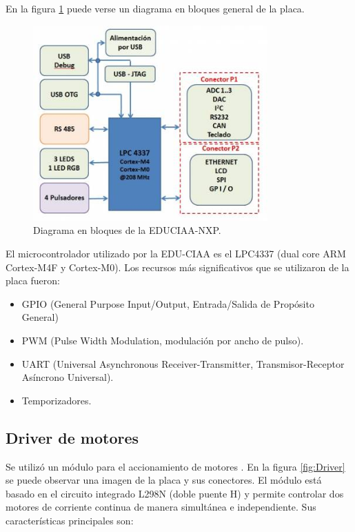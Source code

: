 \pagebreak

En la figura \ref{fig:Bloques} puede verse un diagrama en bloques general de la placa. 

\begin{figure}[htpb]
	\centering
	\includegraphics[width=9cm]{./Figures/Bloques.jpg}
	\caption{Diagrama en bloques de la EDUCIAA-NXP\protect\footnotemark.}
	\label{fig:Bloques}
\end{figure}

El  microcontrolador utilizado por la EDU-CIAA es el LPC4337 (dual core ARM Cortex-M4F y Cortex-M0). Los recursos más significativos que se utilizaron de la placa fueron: 


\begin{itemize}
	\item GPIO (General Purpose Input/Output, Entrada/Salida de Propósito General)
	\item PWM (Pulse Width Modulation, modulación por ancho de pulso).
	\item UART (Universal Asynchronous Receiver-Transmitter, Transmisor-Receptor Asíncrono Universal).
	\item Temporizadores.
\end{itemize}


\subsection{Driver de motores}

Se utilizó un módulo para el accionamiento de motores \citep{Driver}. En la figura \ref{fig:Driver} se puede observar una imagen de la placa y sus conectores. El módulo está basado en el circuito integrado L298N (doble puente H) \citep{L298} y permite controlar dos motores de corriente continua de manera simultánea e independiente.  Sus características principales son:

